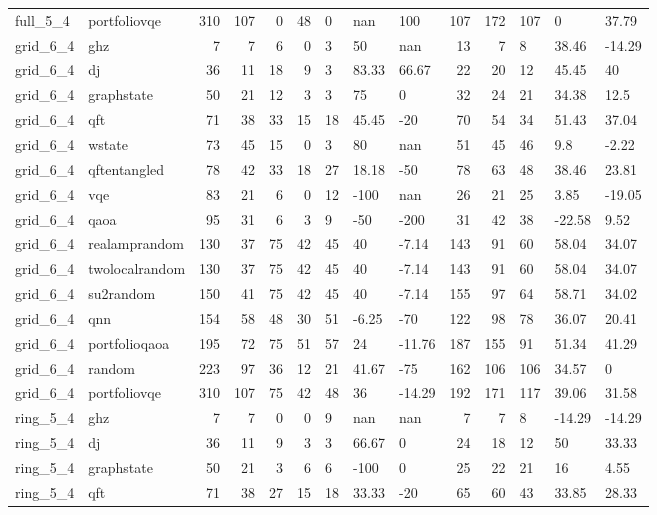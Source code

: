 \begin{longtable}{llrrrrlllrrlll}
full\_5\_4 & portfoliovqe & 310 & 107 & 0 & 48 & 0 & nan & 100 & 107 & 172 & 107 & 0 & 37.79 \\
grid\_6\_4 & ghz & 7 & 7 & 6 & 0 & 3 & 50 & nan & 13 & 7 & 8 & 38.46 & -14.29 \\
grid\_6\_4 & dj & 36 & 11 & 18 & 9 & 3 & 83.33 & 66.67 & 22 & 20 & 12 & 45.45 & 40 \\
grid\_6\_4 & graphstate & 50 & 21 & 12 & 3 & 3 & 75 & 0 & 32 & 24 & 21 & 34.38 & 12.5 \\
grid\_6\_4 & qft & 71 & 38 & 33 & 15 & 18 & 45.45 & -20 & 70 & 54 & 34 & 51.43 & 37.04 \\
grid\_6\_4 & wstate & 73 & 45 & 15 & 0 & 3 & 80 & nan & 51 & 45 & 46 & 9.8 & -2.22 \\
grid\_6\_4 & qftentangled & 78 & 42 & 33 & 18 & 27 & 18.18 & -50 & 78 & 63 & 48 & 38.46 & 23.81 \\
grid\_6\_4 & vqe & 83 & 21 & 6 & 0 & 12 & -100 & nan & 26 & 21 & 25 & 3.85 & -19.05 \\
grid\_6\_4 & qaoa & 95 & 31 & 6 & 3 & 9 & -50 & -200 & 31 & 42 & 38 & -22.58 & 9.52 \\
grid\_6\_4 & realamprandom & 130 & 37 & 75 & 42 & 45 & 40 & -7.14 & 143 & 91 & 60 & 58.04 & 34.07 \\
grid\_6\_4 & twolocalrandom & 130 & 37 & 75 & 42 & 45 & 40 & -7.14 & 143 & 91 & 60 & 58.04 & 34.07 \\
grid\_6\_4 & su2random & 150 & 41 & 75 & 42 & 45 & 40 & -7.14 & 155 & 97 & 64 & 58.71 & 34.02 \\
grid\_6\_4 & qnn & 154 & 58 & 48 & 30 & 51 & -6.25 & -70 & 122 & 98 & 78 & 36.07 & 20.41 \\
grid\_6\_4 & portfolioqaoa & 195 & 72 & 75 & 51 & 57 & 24 & -11.76 & 187 & 155 & 91 & 51.34 & 41.29 \\
grid\_6\_4 & random & 223 & 97 & 36 & 12 & 21 & 41.67 & -75 & 162 & 106 & 106 & 34.57 & 0 \\
grid\_6\_4 & portfoliovqe & 310 & 107 & 75 & 42 & 48 & 36 & -14.29 & 192 & 171 & 117 & 39.06 & 31.58 \\
ring\_5\_4 & ghz & 7 & 7 & 0 & 0 & 9 & nan & nan & 7 & 7 & 8 & -14.29 & -14.29 \\
ring\_5\_4 & dj & 36 & 11 & 9 & 3 & 3 & 66.67 & 0 & 24 & 18 & 12 & 50 & 33.33 \\
ring\_5\_4 & graphstate & 50 & 21 & 3 & 6 & 6 & -100 & 0 & 25 & 22 & 21 & 16 & 4.55 \\
ring\_5\_4 & qft & 71 & 38 & 27 & 15 & 18 & 33.33 & -20 & 65 & 60 & 43 & 33.85 & 28.33 \\

\end{longtable}
